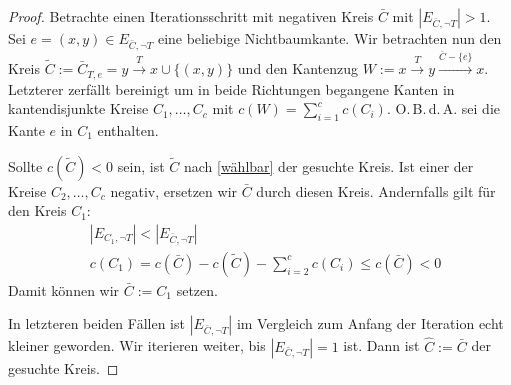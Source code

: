 \documentclass[a4paper,twoside,ngerman]{report}
\theoremstyle{plain}
\theoremstyle{definition}
\newcommand{\Obda}{O.\,B.\,d.\,A. }
\begin{document}
\begin{proof}
Betrachte einen Iterationsschritt mit negativen Kreis $\bar{C}$ mit $|E_{\bar{C},\neg T}|>1$. Sei $e=(x,y)\in E_{\bar{C},\neg T}$ eine beliebige Nichtbaumkante. Wir betrachten nun den Kreis $\tilde{C}:=\bar{C}_{T,e}=y\xrightarrow{T}x\cup\{(x,y)\}$ und den Kantenzug $W:=x\xrightarrow{T}y\xrightarrow{\bar{C}-\{e\}}x$. Letzterer zerfällt bereinigt um in beide Richtungen begangene Kanten in kantendisjunkte Kreise $C_1,\ldots,C_c$ mit $c(W)=\sum_{i=1}^{c} c(C_i)$. \Obda sei die Kante $e$ in $C_1$ enthalten.

Sollte $c(\tilde{C})<0$ sein, ist $\tilde{C}$ nach \cref{wählbar} der gesuchte Kreis. Ist einer der Kreise $C_2,\ldots,C_c$ negativ, ersetzen wir $\bar{C}$ durch diesen Kreis. Andernfalls gilt für den Kreis $C_1$:
\begin{align*}
&|E_{C_1,\neg T}|<|E_{\bar{C},\neg T}| \\
&c(C_1)=c(\bar{C})-c(\tilde{C})-\sum_{i=2}^{c}c(C_i)\leq c(\bar{C})<0
\end{align*}
Damit können wir $\bar{C}:=C_1$ setzen.

In letzteren beiden Fällen ist $|E_{\bar{C},\neg T}|$ im Vergleich zum Anfang der Iteration echt kleiner geworden. Wir iterieren weiter, bis $|E_{\bar{C},\neg T}|=1$ ist. Dann ist $\hat{C}:=\bar{C}$ der gesuchte Kreis.\end{proof}
\end{document}
